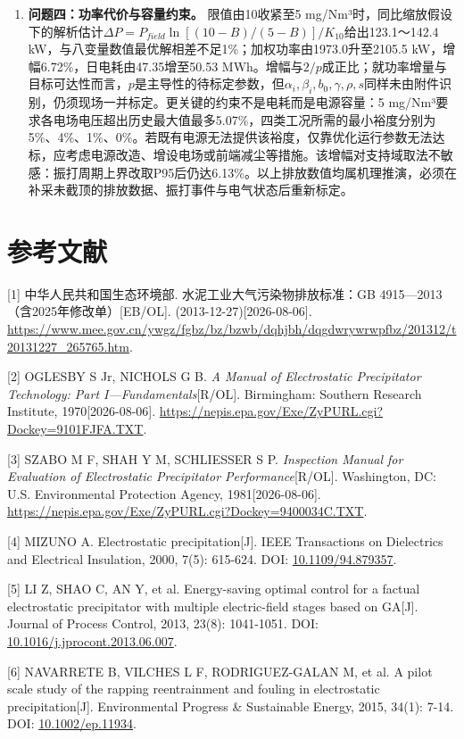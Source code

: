 \documentclass[UTF8,zihao=5,a4paper]{ctexart}
\begin{document}
\begin{enumerate}[itemsep=1pt,topsep=3pt]
\item \textbf{问题四：功率代价与容量约束。} 限值由10收紧至5 mg/Nm³时，同比缩放假设下的解析估计$\Delta P=P_{field}\ln[(10-B)/(5-B)]/K_{10}$给出123.1～142.4 kW，与八变量数值最优解相差不足1\%；加权功率由1973.0升至2105.5 kW，增幅6.72\%，日电耗由47.35增至50.53 MWh。增幅与$2/p$成正比；就功率增量与目标可达性而言，$p$是主导性的待标定参数，但$\alpha_i,\beta_i,b_0,\gamma,\rho,s$同样未由附件识别，仍须现场一并标定。更关键的约束不是电耗而是电源容量：5 mg/Nm³要求各电场电压超出历史最大值最多5.07\%，四类工况所需的最小裕度分别为5\%、4\%、1\%、0\%。若既有电源无法提供该裕度，仅靠优化运行参数无法达标，应考虑电源改造、增设电场或前端减尘等措施。该增幅对支持域取法不敏感：振打周期上界改取P95后仍达6.13\%。以上排放数值均属机理推演，必须在补采未截顶的排放数据、振打事件与电气状态后重新标定。
\end{enumerate}

\section*{参考文献}

[1] 中华人民共和国生态环境部. 水泥工业大气污染物排放标准：GB 4915—2013（含2025年修改单）[EB/OL]. (2013-12-27)[2026-08-06]. \url{https://www.mee.gov.cn/ywgz/fgbz/bz/bzwb/dqhjbh/dqgdwrywrwpfbz/201312/t20131227_265765.htm}.

[2] OGLESBY S Jr, NICHOLS G B. \textit{A Manual of Electrostatic Precipitator Technology: Part I—Fundamentals}[R/OL]. Birmingham: Southern Research Institute, 1970[2026-08-06]. \url{https://nepis.epa.gov/Exe/ZyPURL.cgi?Dockey=9101FJFA.TXT}.

[3] SZABO M F, SHAH Y M, SCHLIESSER S P. \textit{Inspection Manual for Evaluation of Electrostatic Precipitator Performance}[R/OL]. Washington, DC: U.S. Environmental Protection Agency, 1981[2026-08-06]. \url{https://nepis.epa.gov/Exe/ZyPURL.cgi?Dockey=9400034C.TXT}.

[4] MIZUNO A. Electrostatic precipitation[J]. IEEE Transactions on Dielectrics and Electrical Insulation, 2000, 7(5): 615-624. DOI: \url{10.1109/94.879357}.

[5] LI Z, SHAO C, AN Y, et al. Energy-saving optimal control for a factual electrostatic precipitator with multiple electric-field stages based on GA[J]. Journal of Process Control, 2013, 23(8): 1041-1051. DOI: \url{10.1016/j.jprocont.2013.06.007}.

[6] NAVARRETE B, VILCHES L F, RODRIGUEZ-GALAN M, et al. A pilot scale study of the rapping reentrainment and fouling in electrostatic precipitation[J]. Environmental Progress \& Sustainable Energy, 2015, 34(1): 7-14. DOI: \url{10.1002/ep.11934}.
\end{document}
